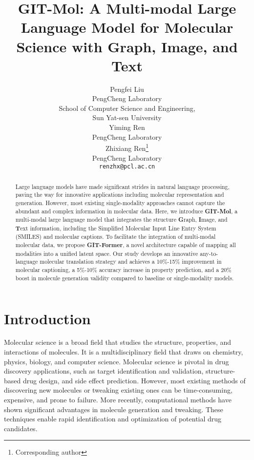\documentclass{article}
\title{GIT-Mol: A Multi-modal Large Language Model for Molecular Science with Graph, Image, and Text}
\author{
  Pengfei Liu \\
  PengCheng Laboratory\\
  School of Computer Science and Engineering, \\
  Sun Yat-sen University\\
\And
  Yiming Ren \\
  PengCheng Laboratory\\
\And
  Zhixiang Ren\thanks{Corresponding author} \\
  PengCheng Laboratory\\
  \texttt{renzhx@pcl.ac.cn} \\
}
\begin{document}
\maketitle

\begin{abstract}
Large language models have made significant strides in natural language processing, paving the way for innovative applications including molecular representation and generation. 
However, most existing single-modality approaches cannot capture the abundant and complex information in molecular data. 
Here, we introduce \textbf{GIT-Mol}, a multi-modal large language model that integrates the structure \textbf{G}raph, \textbf{I}mage, and \textbf{T}ext information, including the Simplified Molecular Input Line Entry System (SMILES) and molecular captions. 
To facilitate the integration of multi-modal molecular data, we propose \textbf{GIT-Former}, a novel architecture capable of mapping all modalities into a unified latent space. 
Our study develops an innovative any-to-language molecular translation strategy and achieves a 10\%-15\% improvement in molecular captioning, a 5\%-10\% accuracy increase in property prediction, and a 20\% boost in molecule generation validity compared to baseline or single-modality models.
\end{abstract}





\section{Introduction}

Molecular science is a broad field that studies the structure, properties, and interactions of molecules. It is a multidisciplinary field that draws on chemistry, physics, biology, and computer science.
Molecular science is pivotal in drug discovery applications, such as target identification and validation, structure-based drug design, and side effect prediction.
However, most existing methods of discovering new molecules or tweaking existing ones can be time-consuming, expensive, and prone to failure\cite{rodrigues2016counting}. 
More recently, computational methods have shown significant advantages in molecule generation and tweaking\cite{bilodeau2022generative}. These techniques enable rapid identification and optimization of potential drug candidates.
\end{document}
